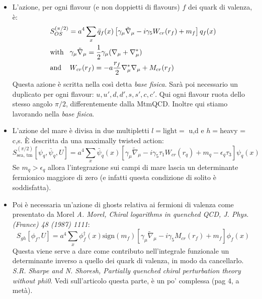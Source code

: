 \documentclass[12pt,a4paper,openright]{article}
\newcommand{\colg}{\textcolor{PineGreen}}
\begin{document}
\begin{itemize}
  \item L'azione, per ogni flavour (e non doppietti di flavours) $f$ dei quark di valenza, è:
        \begin{equation}\label{eq:OSaction}
          \begin{aligned}
            & S_{OS}^{(\pi/2)} = a^4 \sum_{ x} \bar q_f (x) \left[ \gamma_\mu \tilde{\nabla}_\mu - i\gamma_5 W_{cr}(r_f) + m_f \right] q_f (x) \\
            & \text{with}\hspace{3mm} \gamma_\mu\tilde{\nabla}_\mu = \frac{1}{2}\gamma_\mu (\nabla_\mu + \nabla_\mu^*) \\
            & \text{and }\hspace{3mm} W_{cr}(r_f) = - a \frac{r_f}{2} \nabla_\mu^* \nabla_\mu + M_{cr} (r_f)
          \end{aligned}
        \end{equation}
        Questa azione è scritta nella così detta {\it base fisica}. Sarà poi necessario un duplicato per ogni flavour: $u,u',d,d',s,s',c,c'$.
        Qui ogni flavour ruota dello stesso angolo $\pi/2$, differentemente dalla MtmQCD.
        Inoltre qui stiamo lavorando nella {\it base fisica}.
  \item L'azione del mare è divisa in due multipletti $l = \text{light} =$ u,d e $h = $heavy = c,s.
        È descritta da una maximally twisted action:
        \begin{equation*}
          S_{\text{sea, tm}}^{(\pi/2)}[\psi_q, \bar\psi_q,U] = a^4 \sum_{x} \bar\psi_q (x) \left[ \gamma_\mu \tilde{\nabla}_\mu - i \gamma_5 \tau_1 W_{cr}(r_q) + m_q - \epsilon_q \tau_3 \right]\psi_q (x)
        \end{equation*}
        Se $m_q > \epsilon_q$ allora l'integrazione sui campi di mare lascia un determinante fermionico maggiore di zero (e infatti questa condizione di solito è soddisfatta).
  \item Poi è necessaria \colg{un'azione di ghosts relativa ai fermioni di valenza} come presentato da Morel {\it A. Morel, Chiral logarithms in quenched QCD, J. Phys. (France) 48 (1987) 1111}:
        \begin{equation*}
          S_{gh}[\phi_f,U] = a^4 \sum_x \phi_f^\dagger (x) \text{sign}(m_f)\left[ \gamma_\mu \tilde{\nabla}_\mu - i \gamma_5 M_{cr} (r_f) + m_f \right] \phi_f(x)
        \end{equation*}
        Questa viene serve a dare come contributo nell'integrale funzionale un determinante inverso a quello dei quark di valenza, in modo da cancellarlo.
        {\it S.R. Sharpe and N. Shoresh, Partially quenched chiral perturbation theory without phi0}.
        Vedi sull'articolo questa parte, è un po' complessa (pag 4, a metà). 
\end{itemize}
\end{document}
